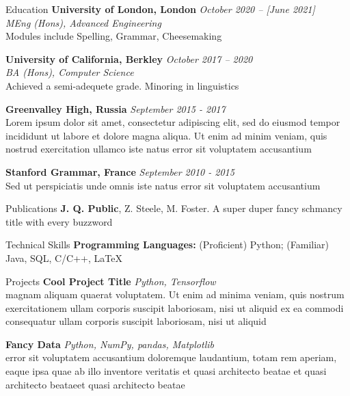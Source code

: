 \documentclass[options]{resume}
\begin{document}
	
	\begin{rSection}{Education}
		{\bf University of London, London} \hfill {\em October 2020 – [June 2021]} 
		\\ \textit{MEng (Hons), Advanced Engineering}
		\\ Modules include Spelling, Grammar, Cheesemaking
		
		{\bf University of California, Berkley} \hfill {\em October 2017 – 2020} 
		\\ \textit{BA (Hons), Computer Science}
		\\ Achieved a semi-adequete grade. Minoring in linguistics

		{\bf Greenvalley High, Russia} \hfill {\em September 2015 - 2017} 
		\\ Lorem ipsum dolor sit amet, consectetur adipiscing elit, sed do eiusmod tempor incididunt ut labore et dolore magna aliqua. Ut enim ad minim veniam, quis nostrud exercitation ullamco iste natus error sit voluptatem accusantium
		
		{\bf Stanford Grammar, France} \hfill {\em September 2010 - 2015} 
		\\ Sed ut perspiciatis unde omnis iste natus error sit voluptatem accusantium
	\end{rSection}
	
    \begin{rSection}{Publications}
    \textbf{J. Q. Public}, Z. Steele, M. Foster. A super duper fancy schmancy title with every buzzword
    \end{rSection}

	\begin{rSection}{Technical Skills}
		\textbf{{Programming Languages:}} (Proficient) Python; (Familiar) Java, SQL, C/C++, \LaTeX 
	\end{rSection}

	\begin{rSection}{Projects}
	    \textbf{Cool Project Title}
		\addressSep
		\emph{ Python, Tensorflow}
		\\ magnam aliquam quaerat voluptatem. Ut enim ad minima veniam, quis nostrum exercitationem ullam corporis suscipit laboriosam, nisi ut aliquid ex ea commodi consequatur ullam corporis suscipit laboriosam, nisi ut aliquid 
		
		\textbf{Fancy Data}
		\addressSep
		\emph{ Python, NumPy, pandas, Matplotlib}
		\\ error sit voluptatem accusantium doloremque laudantium, totam rem aperiam, eaque ipsa quae ab illo inventore veritatis et quasi architecto beatae et quasi architecto beataeet quasi architecto beatae 
		
	\end{rSection}
\end{document}
